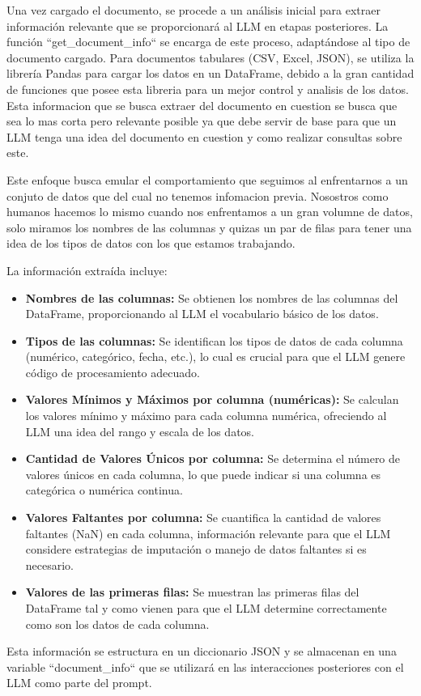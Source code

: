 Una vez cargado el documento, se procede a un análisis inicial para extraer información relevante que se proporcionará al LLM en etapas posteriores. La función ``get\_document\_info`` se encarga de este proceso, adaptándose al tipo de documento cargado.  Para documentos tabulares (CSV, Excel, JSON), se utiliza la librería Pandas para cargar los datos en un DataFrame, debido a la gran cantidad de funciones que posee esta libreria para un mejor control y analisis de los datos. Esta informacion que se busca extraer del documento en cuestion se busca que sea lo mas corta pero relevante posible ya que debe servir de base para que un LLM tenga una idea del documento en cuestion y como realizar consultas sobre este.

Este enfoque busca emular el comportamiento que seguimos al enfrentarnos a un conjuto de datos que del cual no tenemos infomacion previa. Nosostros como humanos hacemos lo mismo cuando nos enfrentamos a un gran volumne de datos, solo miramos los nombres de las columnas y quizas un par de filas para tener una idea de los tipos de datos con los que estamos trabajando. 

La información extraída incluye:

\begin{itemize}
	\item \textbf{Nombres de las columnas:}  Se obtienen los nombres de las columnas del DataFrame, proporcionando al LLM el vocabulario básico de los datos.
	\item \textbf{Tipos de las columnas:}  Se identifican los tipos de datos de cada columna (numérico, categórico, fecha, etc.),  lo cual es crucial para que el LLM genere código de procesamiento adecuado.
	\item \textbf{Valores Mínimos y Máximos por columna (numéricas):} Se calculan los valores mínimo y máximo para cada columna numérica, ofreciendo al LLM una idea del rango y escala de los datos.
	\item \textbf{Cantidad de Valores Únicos por columna:} Se determina el número de valores únicos en cada columna, lo que puede indicar si una columna es categórica o numérica continua.
	\item \textbf{Valores Faltantes por columna:} Se cuantifica la cantidad de valores faltantes (NaN) en cada columna, información relevante para que el LLM considere estrategias de imputación o manejo de datos faltantes si es necesario.
	\item \textbf{Valores de las primeras filas:} Se muestran las primeras filas del DataFrame tal y como vienen para que el LLM determine correctamente como son los datos de cada columna.
\end{itemize}
Esta información se estructura en un diccionario JSON y se almacenan en una variable ``document\_info`` que se utilizará en las interacciones posteriores con el LLM como parte del prompt.

